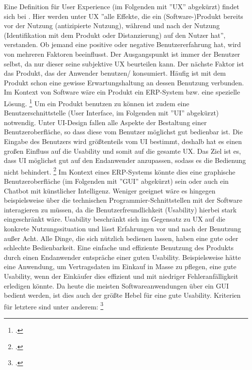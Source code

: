 Eine Definition für User Experience (im Folgenden mit ''UX'' abgekürzt) findet sich bei \cite[][(S. 26f):]{theorie_beyer_user_experience_mit_sap_2020}. Hier werden unter UX ''alle Effekte, die ein (Software-)Produkt bereits vor der Nutzung (antizipierte Nutzung), während und nach der Nutzung (Identifikation mit dem Produkt oder Distanzierung) auf den Nutzer hat'', verstanden. Ob jemand eine positive oder negative Benutzererfahrung hat, wird von mehreren Faktoren beeinflusst. Der Ausgangspunkt ist immer der Benutzer selbst, da nur dieser seine subjektive UX beurteilen kann. Der nächste Faktor ist das Produkt, das der Anwender benutzen/ konsumiert. Häufig ist mit dem Produkt schon eine gewisse Erwartungshaltung an dessen Benutzung verbunden. Im Kontext von Software wäre ein Produkt \zB ein ERP-System bzw. eine spezielle Lösung. \footcite[Vgl.][S. 27]{theorie_beyer_user_experience_mit_sap_2020} Um ein Produkt benutzen zu können ist zudem eine Benutzerschnittstelle (User Interface, im Folgenden mit ''UI'' abgekürzt) notwendig. Unter UI-Design fallen alle Aspekte der Bestaltung einer Benutzeroberfläche, so dass diese vom Benutzer möglichst gut bedienbar ist. Die Eingabe des Benutzers wird grö\ss tenteils vom UI bestimmt, deshalb hat es einen gro\ss en Einfluss auf die Usability und somit auf die gesamte UX. Das Ziel ist es, dass UI möglichst gut auf den Endanwender anzupassen, sodass es die Bedienung nicht behindert. \footcite[Vgl.][S. 31f]{theorie_beyer_user_experience_mit_sap_2020} Im Kontext eines ERP-Systems könnte dies eine graphische Benutzeroberfläche (im Folgenden mit ''GUI'' abgekürzt) sein oder auch ein Chatbot mit künstlicher Intelligenz. Weniger geeignet wäre es hingegen beispielsweise über die technischen Programmier-Schnittstellen mit der Software interagieren zu müssen, da die Benutzerfreundlichkeit (Usability) hierbei stark eingeschränkt wäre. Usability beschränkt sich im Gegensatz zu UX auf die konkrete Nutzungssituation und lässt Erfahrungen vor und nach der Benutzung au\ss er Acht. Alle Dinge, die sich nützlich bedienen lassen, haben eine gute oder schlechte Bedienbarkeit. Eine einfache und effiziente Benutzung des Produkts durch einen Endanwender entspräche einer guten Usability. Beispielsweise hätte eine Anwendung, um Vertragsdaten im Einkauf in Masse zu pflegen, eine gute Usability, wenn der Einkäufer dies effizient und mit niedriger Fehleranfälligkeit erledigen könnte. Da heute die meisten Softwareanwendungen über ein GUI bedient werden, ist dies auch der grö\ss te Hebel für eine gute Usability. Kriterien für letztere sind unter anderem: \footcite[Vgl.][]{theorie_ux_din_iso_9241_110_2006}

